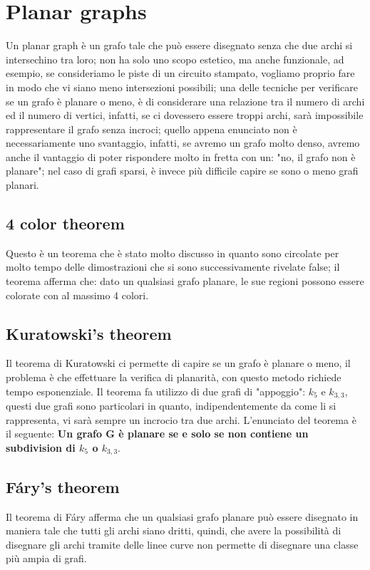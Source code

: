\documentclass[12pt,a4paper]{article}
\begin{document}
\section{Planar graphs}
Un planar graph è un grafo tale che può essere disegnato senza che due archi si intersechino tra loro; non ha solo uno scopo estetico, ma anche funzionale, ad esempio, se consideriamo le piste di un circuito stampato, vogliamo proprio fare in modo che vi siano meno intersezioni possibili; una delle tecniche per verificare se un grafo è planare o meno, è di considerare una relazione tra il numero di archi ed il numero di vertici, infatti, se ci dovessero essere troppi archi, sarà impossibile rappresentare il grafo senza incroci; quello appena enunciato non è necessariamente uno svantaggio, infatti, se avremo un grafo molto denso, avremo anche il vantaggio di poter rispondere molto in fretta con un: "no, il grafo non è planare"; nel caso di grafi sparsi, è invece più difficile capire se sono o meno grafi planari.

\subsection{4 color theorem}
Questo è un teorema che è stato molto discusso in quanto sono circolate per molto tempo delle dimostrazioni che si sono successivamente rivelate false; il teorema afferma che: dato un qualsiasi grafo planare, le sue regioni possono essere colorate con al massimo 4 colori.

\subsection{Kuratowski's theorem}
Il teorema di Kuratowski ci permette di capire se un grafo è planare o meno, il problema è che effettuare la verifica di planarità, con questo metodo richiede tempo esponenziale. Il teorema fa utilizzo di due grafi di "appoggio": $k_5$ e $k_{3,3}$, questi due grafi sono particolari in quanto, indipendentemente da come li si rappresenta, vi sarà sempre un incrocio tra due archi. L'enunciato del teorema è il seguente: \textbf{Un grafo G è planare se e solo se non contiene un subdivision di $k_5$ o $k_{3,3}$}.

\subsection{Fáry's theorem}
Il teorema di Fáry afferma che un qualsiasi grafo planare può essere disegnato in maniera tale che tutti gli archi siano dritti, quindi, che avere la possibilità di disegnare gli archi tramite delle linee curve non permette di disegnare una classe più ampia di grafi.
\end{document}
